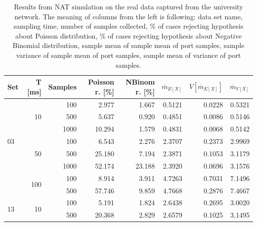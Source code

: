 \documentclass[twoside]{article}
\begin{document}
\begin{multicols}{2}
\begin{table}[t]
  \centering
  \begin{tabular}{| l | r | r | r | r | r | r | r |} %
    \hline
    Set & T [ms] & Samples & Poisson r. [\%] & NBinom r. [\%] & $\overline{m}_{E[X]}$ &  $V[\overline{m}_{E[X]}]$  & $\overline{m}_{V[X]}$ \\ \hline \hline 
    \multirow{7}{*}{03} & \multirow{3}{*}{10}   & 100		& 2.977		& 1.667		& 0.5121        & 0.0228                    & 0.5321 \\ \cline{3-8}
      &      & 500      	& 5.637		& 0.920		& 0.4851        & 0.0086        & 0.5146 \\  \cline{3-8}
      &      & 1000     	& 10.294	& 1.579		& 0.4831        & 0.0068        & 0.5142 \\  \cline{2-8}
      & \multirow{3}{*}{50}     & 100     	& 6.543		& 2.276 	& 2.3707	& 0.2373 & 2.9969 \\ \cline{3-8}
      &      & 500     		& 25.180	& 7.194		& 2.3871        & 0.1053        & 3.1179 \\ \cline{3-8}
      &      & 1000    		& 52.174	& 23.188	& 2.3920        & 0.0696        & 3.1576 \\ \cline{2-8}
      & \multirow{2}{*}{100}  	& 100		& 8.914		& 3.911		& 4.7263        & 0.7031                    & 7.1496 \\ \cline{3-8}
      &      & 500     		& 57.746	& 9.859		& 4.7668	& 0.2876 	& 7.4667 					\\ \hline

    \multirow{2}{*}{13}  & \multirow{2}{*}{10}     & 100     & 5.191      & 1.824     & 2.6438       &  0.2695    & 3.0020 \\ \cline{3-8}
      &      & 500     & 20.368     & 2.829     & 2.6579       &  0.1025                    & 3.1495 \\ \hline
  \end{tabular}
  \caption{Results from NAT simulation on the real data captured from the university network. 
    The meaning of columns from the left is following: data set name, sampling time, number of samples collected,
    \% of cases rejecting hypothesis about Poisson distribution,  
    \% of cases rejecting hypothesis about Negative Binomial distribution,
    sample mean of sample mean of port samples,
    sample variance of sample mean of port samples,
    sample mean of variance of port samples.}
  \label{tab:1}
\end{table}


\end{multicols}
\end{document}
